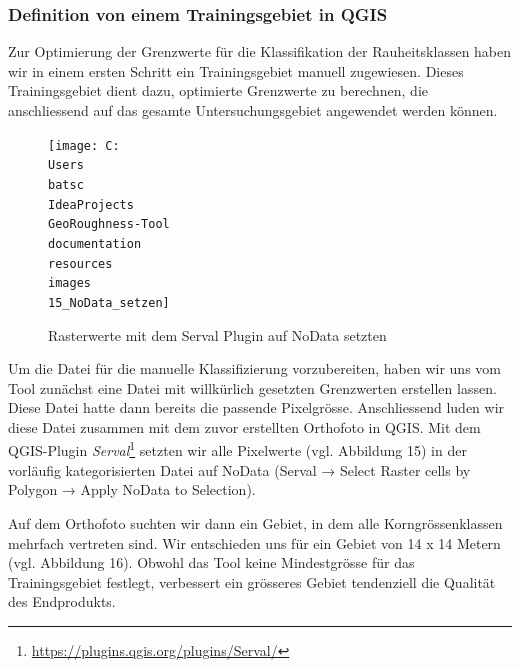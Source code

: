 \documentclass[12pt]{article}
\begin{document}
        \subsubsection{Definition von einem Trainingsgebiet in QGIS}\label{subsubsec:definition-von-einem-trainingsgebiet-in-qgis}

            Zur Optimierung der Grenzwerte für die Klassifikation der Rauheitsklassen haben wir in einem ersten Schritt ein Trainingsgebiet manuell zugewiesen.
            Dieses Trainingsgebiet dient dazu, optimierte Grenzwerte zu berechnen, die anschliessend auf das gesamte Untersuchungsgebiet angewendet werden können.

            \begin{figure}
                \centering
                \texttt{[image: C:\\Users\\batsc\\IdeaProjects\\GeoRoughness-Tool\\documentation\\resources\\images\\15\_NoData\_setzen]}
                \caption{Rasterwerte mit dem Serval Plugin auf NoData setzten}
                \label{fig:15_nodata_setzen}
            \end{figure}

            Um die Datei für die manuelle Klassifizierung vorzubereiten, haben wir uns vom Tool zunächst eine Datei mit willkürlich gesetzten Grenzwerten erstellen lassen.
            Diese Datei hatte dann bereits die passende Pixelgrösse.
            Anschliessend luden wir diese Datei zusammen mit dem zuvor erstellten Orthofoto in QGIS.
            Mit dem QGIS-Plugin \textit{Serval}\footnote{\href{https://plugins.qgis.org/plugins/Serval/}{https://plugins.qgis.org/plugins/Serval/}} setzten wir alle Pixelwerte (vgl. Abbildung 15) in der vorläufig kategorisierten Datei auf NoData (Serval → Select Raster cells by Polygon → Apply NoData to Selection). %

            Auf dem Orthofoto suchten wir dann ein Gebiet, in dem alle Korngrössenklassen mehrfach vertreten sind. 
            Wir entschieden uns für ein Gebiet von 14 x 14 Metern (vgl. Abbildung 16). %
            Obwohl das Tool keine Mindestgrösse für das Trainingsgebiet festlegt, verbessert ein grösseres Gebiet tendenziell die Qualität des Endprodukts.
            
\end{document}

